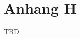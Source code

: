 %
%
\glsresetall

\let\raggedsection\centering 
\chapter{Anhang H}\label{chap.appendix_fragebogen}
\let\raggedsection\raggedright 
\begin{RaggedRight}
TBD
\end{RaggedRight}
